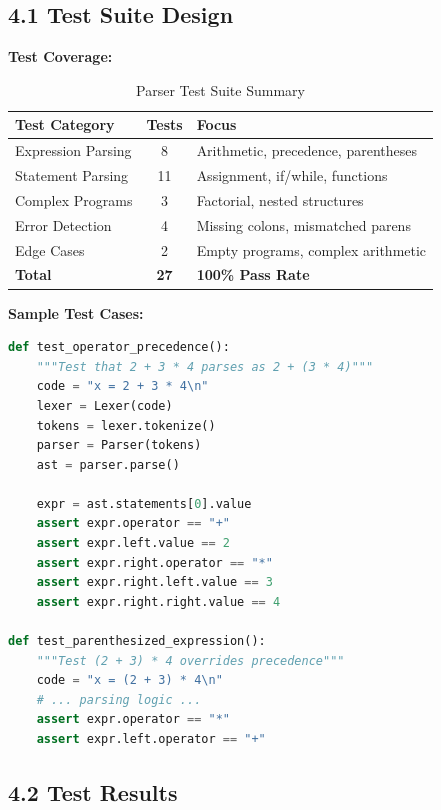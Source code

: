 \documentclass[a4paper,11pt]{article}
\begin{document}
\subsection{4.1 Test Suite Design}

\textbf{Test Coverage:}

\begin{table}[h]
\centering
\begin{tabularx}{\textwidth}{|l|c|X|}
\hline
\rowcolor{blue!10}
\textbf{Test Category} & \textbf{Tests} & \textbf{Focus} \\
\hline
Expression Parsing & 8 & Arithmetic, precedence, parentheses \\
\hline
Statement Parsing & 11 & Assignment, if/while, functions \\
\hline
Complex Programs & 3 & Factorial, nested structures \\
\hline
Error Detection & 4 & Missing colons, mismatched parens \\
\hline
Edge Cases & 2 & Empty programs, complex arithmetic \\
\hline
\textbf{Total} & \textbf{27} & \textbf{100\% Pass Rate} \\
\hline
\end{tabularx}
\caption{Parser Test Suite Summary}
\end{table}

\textbf{Sample Test Cases:}

\begin{lstlisting}[language=Python, caption=Expression Parser Tests]
def test_operator_precedence():
    """Test that 2 + 3 * 4 parses as 2 + (3 * 4)"""
    code = "x = 2 + 3 * 4\n"
    lexer = Lexer(code)
    tokens = lexer.tokenize()
    parser = Parser(tokens)
    ast = parser.parse()
    
    expr = ast.statements[0].value
    assert expr.operator == "+"
    assert expr.left.value == 2
    assert expr.right.operator == "*"
    assert expr.right.left.value == 3
    assert expr.right.right.value == 4

def test_parenthesized_expression():
    """Test (2 + 3) * 4 overrides precedence"""
    code = "x = (2 + 3) * 4\n"
    # ... parsing logic ...
    assert expr.operator == "*"
    assert expr.left.operator == "+"
\end{lstlisting}

\subsection{4.2 Test Results}
\end{document}
